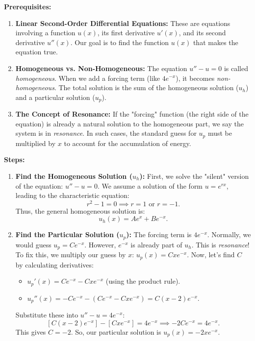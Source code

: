 \begin{solution}
\textbf{Prerequisites:}
\begin{enumerate}
    \item \textbf{Linear Second-Order Differential Equations:} These are equations involving a function $u(x)$, its first derivative $u'(x)$, and its second derivative $u''(x)$. Our goal is to find the function $u(x)$ that makes the equation true.
    \item \textbf{Homogeneous vs. Non-Homogeneous:} The equation $u'' - u = 0$ is called \textit{homogeneous}. When we add a forcing term (like $4e^{-x}$), it becomes \textit{non-homogeneous}. The total solution is the sum of the homogeneous solution ($u_h$) and a particular solution ($u_p$).
    \item \textbf{The Concept of Resonance:} If the "forcing" function (the right side of the equation) is already a natural solution to the homogeneous part, we say the system is in \textit{resonance}. In such cases, the standard guess for $u_p$ must be multiplied by $x$ to account for the accumulation of energy.
\end{enumerate}

\textbf{Steps:}
\begin{enumerate}
    \item \textbf{Find the Homogeneous Solution ($u_h$):}
        First, we solve the "silent" version of the equation: $u'' - u = 0$.
        We assume a solution of the form $u = e^{rx}$, leading to the characteristic equation:
        \[ r^2 - 1 = 0 \implies r = 1 \text{ or } r = -1. \]
        Thus, the general homogeneous solution is:
        \[ u_h(x) = A e^x + B e^{-x}. \]

    \item \textbf{Find the Particular Solution ($u_p$):}
        The forcing term is $4e^{-x}$. Normally, we would guess $u_p = C e^{-x}$. However, $e^{-x}$ is already part of $u_h$. This is \textit{resonance}!
        To fix this, we multiply our guess by $x$: $u_p(x) = C x e^{-x}$.
        Now, let's find $C$ by calculating derivatives:
        \begin{itemize}
            \item $u_p'(x) = C e^{-x} - C x e^{-x}$ (using the product rule).
            \item $u_p''(x) = -C e^{-x} - (C e^{-x} - C x e^{-x}) = C(x - 2) e^{-x}$.
        \end{itemize}
        Substitute these into $u'' - u = 4e^{-x}$:
        \[ [C(x - 2) e^{-x}] - [C x e^{-x}] = 4e^{-x} \implies -2C e^{-x} = 4e^{-x}. \]
        This gives $C = -2$. So, our particular solution is $u_p(x) = -2x e^{-x}$.


\end{enumerate}
\end{solution}
